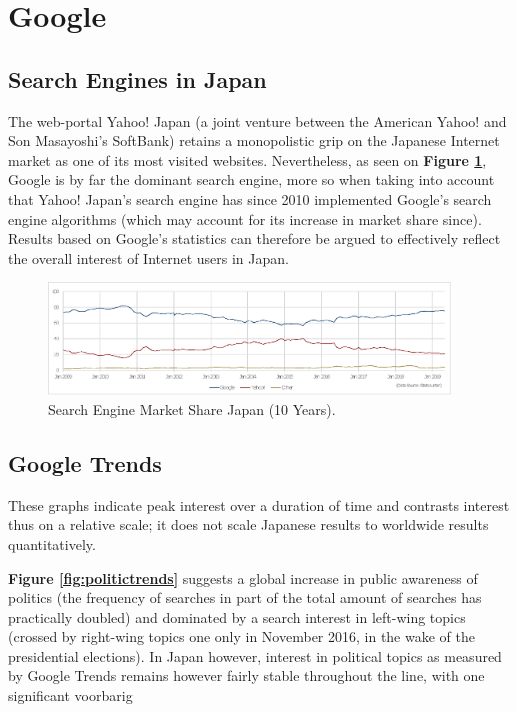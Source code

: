 \documentclass[10pt,british,A4paper,,openany]{memoir}
\begin{document}
\section{Google}\label{google}

\subsection{Search Engines in Japan}\label{search-engines-in-japan}

The web-portal Yahoo! Japan (a joint venture between the American Yahoo!
and Son Masayoshi's SoftBank) retains a monopolistic grip on the
Japanese Internet market as one of its most visited websites.
Nevertheless, as seen on \textbf{Figure \ref{fig:searchengine}}, Google
is by far the dominant search engine, more so when taking into account
that Yahoo! Japan's search engine has since 2010 implemented Google's
search engine algorithms (which may account for its increase in market
share since). Results based on Google's statistics can therefore be
argued to effectively reflect the overall interest of Internet users in
Japan.

\begin{figure}[!htb]
 \centering
 \caption{\label{fig:searchengine} Search Engine Market Share Japan (10 Years).}
 \includegraphics[width=0.95\textwidth,trim=4 4 4 4,clip]{images/searchengine.eps}
 \end{figure}

\subsection{Google Trends}\label{google-trends}

\label{appendix:googletrends}

These graphs indicate peak interest over a duration of time and
contrasts interest thus on a relative scale; it does not scale Japanese
results to worldwide results quantitatively.

\textbf{Figure \ref{fig:politictrends}} suggests a global increase in
public awareness of politics (the frequency of searches in part of the
total amount of searches has practically doubled) and dominated by a
search interest in left-wing topics (crossed by right-wing topics one
only in November 2016, in the wake of the presidential elections). In
Japan however, interest in political topics as measured by Google Trends
remains however fairly stable throughout the line, with one significant
voorbarig
\end{document}
